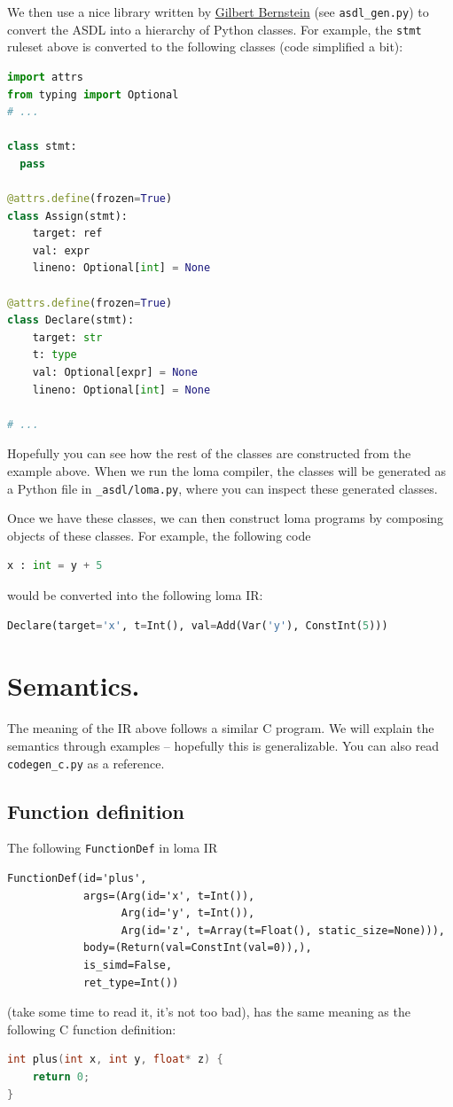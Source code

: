 We then use a nice library written by \href{https://www.gilbertbernstein.com/}{Gilbert Bernstein} (see \lstinline{asdl_gen.py}) to convert the ASDL into a hierarchy of Python classes. For example, the \lstinline{stmt} ruleset above is converted to the following classes (code simplified a bit):
\begin{lstlisting}[language=python]
import attrs
from typing import Optional
# ...

class stmt:
  pass

@attrs.define(frozen=True)
class Assign(stmt):
    target: ref
    val: expr
    lineno: Optional[int] = None

@attrs.define(frozen=True)
class Declare(stmt):
    target: str
    t: type
    val: Optional[expr] = None
    lineno: Optional[int] = None

# ...
\end{lstlisting}
Hopefully you can see how the rest of the classes are constructed from the example above. When we run the loma compiler, the classes will be generated as a Python file in \lstinline{_asdl/loma.py}, where you can inspect these generated classes. 

Once we have these classes, we can then construct loma programs by composing objects of these classes. For example, the following code
\begin{lstlisting}[language=python]
x : int = y + 5
\end{lstlisting}
would be converted into the following loma IR:
\begin{lstlisting}[language=python]
Declare(target='x', t=Int(), val=Add(Var('y'), ConstInt(5)))
\end{lstlisting}

\section{Semantics.}
The meaning of the IR above follows a similar C program. We will explain the semantics through examples -- hopefully this is generalizable. You can also read \lstinline{codegen_c.py} as a reference.

\subsection{Function definition} 
The following \lstinline{FunctionDef} in loma IR
\begin{lstlisting}
FunctionDef(id='plus',
            args=(Arg(id='x', t=Int()),
                  Arg(id='y', t=Int()),
                  Arg(id='z', t=Array(t=Float(), static_size=None))),
            body=(Return(val=ConstInt(val=0)),),
            is_simd=False,
            ret_type=Int())
\end{lstlisting}
(take some time to read it, it's not too bad), has the same meaning as the following C function definition:
\begin{lstlisting}[language=C]
int plus(int x, int y, float* z) {
    return 0;
}
\end{lstlisting}

